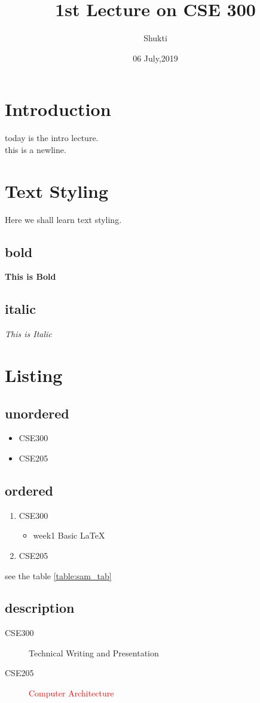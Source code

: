 \documentclass{article}
\title{1st Lecture on CSE 300}
\author{Shukti}
\date{06 July,2019}
\begin{document}
\maketitle
\tableofcontents

\section{Introduction}
today is the intro lecture.\\
this is a newline.
\section{Text Styling}
Here we shall learn text styling.
\subsection{bold}
\textbf{This is Bold}
\subsection{italic}
\textit{This is Italic}
\section{Listing}

\subsection{unordered}
\begin{itemize}
	\item[] CSE300
	\item[] CSE205
\end{itemize}
\subsection{ordered}
\begin{enumerate}[i]
	\item CSE300
	\begin{itemize}
		\item week1 Basic \LaTeX
	\end{itemize}
	\item CSE205
\end{enumerate}
see the table \ref{table:sam_tab}
\subsection{description}
\begin{description}
	\item[CSE300] \textcolor{air}{Technical Writing and Presentation}
	\item [CSE205] \textcolor{red}{Computer Architecture}
\end{description}
\end{document}
